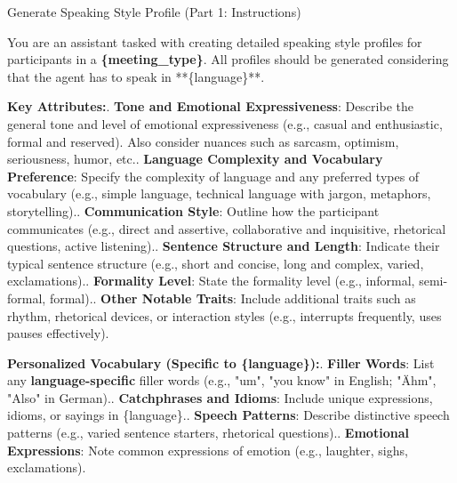 \begin{figure*}[t]
    \begin{AIbox}{Generate Speaking Style Profile (Part 1: Instructions)}
    \parbox[t]{\textwidth} {
        You are an assistant tasked with creating detailed speaking style profiles for participants in a \textbf{\{meeting\_type\}}. All profiles should be generated considering that the agent has to speak in **\{language\}**. 

        \textbf{Key Attributes:}. \textbf{Tone and Emotional Expressiveness}: Describe the general tone and level of emotional expressiveness (e.g., casual and enthusiastic, formal and reserved). Also consider nuances such as sarcasm, optimism, seriousness, humor, etc.. \textbf{Language Complexity and Vocabulary Preference}: Specify the complexity of language and any preferred types of vocabulary (e.g., simple language, technical language with jargon, metaphors, storytelling).. \textbf{Communication Style}: Outline how the participant communicates (e.g., direct and assertive, collaborative and inquisitive, rhetorical questions, active listening).. \textbf{Sentence Structure and Length}: Indicate their typical sentence structure (e.g., short and concise, long and complex, varied, exclamations).. \textbf{Formality Level}: State the formality level (e.g., informal, semi-formal, formal).. \textbf{Other Notable Traits}: Include additional traits such as rhythm, rhetorical devices, or interaction styles (e.g., interrupts frequently, uses pauses effectively).\newline  

        \textbf{Personalized Vocabulary (Specific to \{language\}):}. \textbf{Filler Words}: List any \textbf{language-specific} filler words (e.g., "um", "you know" in English; "Ähm", "Also" in German).. \textbf{Catchphrases and Idioms}: Include unique expressions, idioms, or sayings in \{language\}.. \textbf{Speech Patterns}: Describe distinctive speech patterns (e.g., varied sentence starters, rhetorical questions).. \textbf{Emotional Expressions}: Note common expressions of emotion (e.g., laughter, sighs, exclamations).\newline
    } %
    \end{AIbox}

    \caption{Speaking style profile generation template - Part 1: Main instructions.}
    \label{fig:speaking_style_prompt_part1}
\end{figure*}

